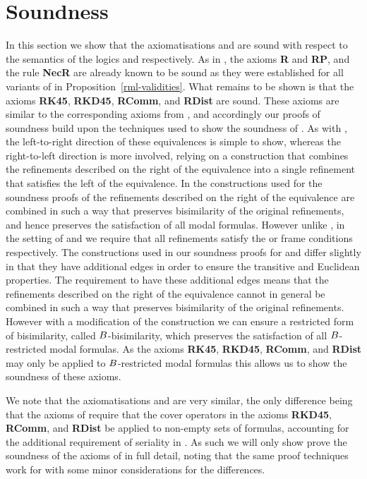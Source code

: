 \section{Soundness}\label{rml-kd45-soundness}

In this section we show that the axiomatisations \axiomRmlKFF{} and \axiomRmlKD{} are sound with respect to the semantics of the logics \logicRmlKFF{} and \logicRmlKD{} respectively.
As in \logicRmlK{}, the axioms {\bf R} and {\bf RP}, and the rule {\bf NecR} are already known to be sound as they were established for all variants of \logicRml{} in Proposition~\ref{rml-validities}.
What remains to be shown is that the axioms {\bf RK45}, {\bf RKD45}, {\bf RComm}, and {\bf RDist} are sound.
These axioms are similar to the corresponding axioms from \axiomRmlK{}, and accordingly our proofs of soundness build upon the techniques used to show the soundness of \axiomRmlK{}.
As with \axiomRmlK{}, the left-to-right direction of these equivalences is simple to show, whereas the right-to-left direction is more involved, relying on a construction that combines the refinements described on the right of the equivalence into a single refinement that satisfies the left of the equivalence.
In the constructions used for the soundness proofs of \axiomRmlK{} the refinements described on the right of the equivalence are combined in such a way that preserves bisimilarity of the original refinements, and hence preserves the satisfaction of all modal formulas.
However unlike \logicRmlK{}, in the setting of \logicRmlKFF{} and \logicRmlKD{} we require that all refinements satisfy the \classKFF{} or \classKD{} frame conditions respectively.
The constructions used in our soundness proofs for \axiomRmlKFF{} and \axiomRmlKD{} differ slightly in that they have additional edges in order to ensure the transitive and Euclidean properties.
The requirement to have these additional edges means that the refinements described on the right of the equivalence cannot in general be combined in such a way that preserves bisimilarity of the original refinements.
However with a modification of the construction we can ensure a restricted form of bisimilarity, called $B$-bisimilarity, which preserves the satisfaction of all $B$-restricted modal formulas.
As the axioms {\bf RK45}, {\bf RKD45}, {\bf RComm}, and {\bf RDist} may only be applied to $B$-restricted modal formulas this allows us to show the soundness of these axioms.

We note that the axiomatisations \axiomRmlKFF{} and \axiomRmlKD{} are very similar, the only difference being that the axioms of \axiomRmlKD{} require that the cover operators in the axioms {\bf RKD45}, {\bf RComm}, and {\bf RDist} be applied to non-empty sets of formulas, accounting for the additional requirement of seriality in \classKD{}.
As such we will only show prove the soundness of the axioms of \axiomRmlKFF{} in full detail, noting that the same proof techniques work for \axiomRmlKD{} with some minor considerations for the differences.

